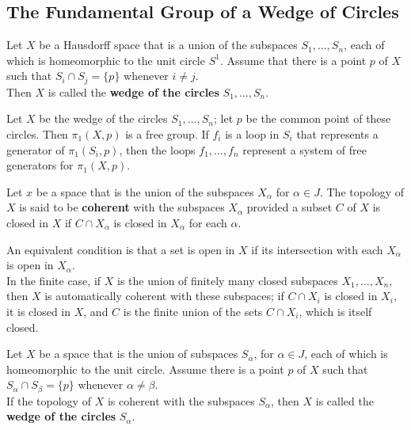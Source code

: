 \subsection{The Fundamental Group of a Wedge of Circles}

\begin{definition}
Let $X$ be a Hausdorff space that is a union of the subspaces $S_1, \dots, S_n$, each of which is homeomorphic to the unit circle $S^1$.
Assume that there is a point $p$ of $X$ such that $S_i \cap S_j = \{ p \}$ whenever $i \neq j$. \\

Then $X$ is called the \textbf{wedge of the circles} $S_1, \dots, S_n$.
\end{definition}

\begin{theorem}
Let $X$ be the wedge of the circles $S_1, \dots, S_n$; let $p$ be the common point of these circles. Then $\pi_1(X, p)$ is a free group. If $f_i$ is a loop in $S_i$ 
that represents a generator of $\pi_1(S_i, p)$, then the loops $f_1, \dots, f_n$ represent a system of free generators for $\pi_1(X, p)$.
\end{theorem}

\begin{definition}[Coherence]
Let $x$ be a space that is the union of the subspaces $X_\alpha$ for $\alpha \in J$. The topology of $X$ is said to be \textbf{coherent}
with the subspaces $X_\alpha$ provided a subset $C$ of $X$ is closed in $X$ if $C \cap X_\alpha$ is closed in $X_\alpha$ for each $\alpha$.
\end{definition}

\begin{remark}
An equivalent condition is that a set is open in $X$ if its intersection with each $X_\alpha$ is open in $X_\alpha$. \\

In the finite case, if $X$ is the union of finitely many closed subspaces $X_1, \dots, X_n$, then $X$ is automatically coherent with these subspaces;
if $C \cap X_i$ is closed in $X_i$, it is closed in $X$, and $C$ is the finite union of the sets $C \cap X_i$, which is itself closed.
\end{remark}

\begin{definition}
    Let $X$ be a space that is the union of subspaces $S_\alpha$, for $\alpha \in J$, each of which is homeomorphic to the unit circle.
    Assume there is a point $p$ of $X$ such that $S_\alpha \cap S_\beta = \{ p \}$ whenever $\alpha \neq \beta$. \\
    
    If the topology of $X$ is coherent with the subspaces $S_\alpha$, then $X$ is called the \textbf{wedge of the circles} $S_\alpha$.
\end{definition}

